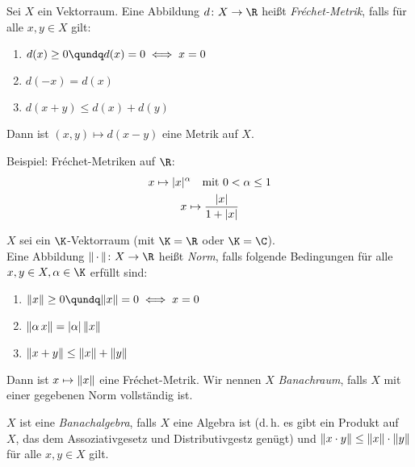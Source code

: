\begin{thEmpty}
    Sei $X$ ein Vektorraum. Eine Abbildung $d\colon X\to\R$ heißt
    \emph{Fr\'echet-Metrik}, falls für alle $x,y\in X$ gilt:
    \begin{enumerate}[({F}1),labelsep=1em,leftmargin=2cm]
        \item
            $d(x) \geq 0 \qundq d(x)=0 \iff x=0$
        \item
            $d(-x) = d(x)$
        \item
            $d(x+y) \leq d(x) + d(y)$
    \end{enumerate}
    Dann ist $(x,y)\mapsto d(x-y)$ eine Metrik auf $X$.

    Beispiel: Fr\'echet-Metriken auf $\R$:
    \begin{gather*}
        x\mapsto \lvert x\rvert^\alpha \quad\text{mit $0<\alpha\leq1$}
        \\
        x\mapsto \frac{\lvert x\rvert}{1+\lvert x\rvert}
    \end{gather*}
\end{thEmpty}


\begin{thEmpty}[Norm]
    $X$ sei ein $\K$-Vektorraum (mit $\K=\R$ oder $\K=\C$).\\
    Eine Abbildung $\emptyNorm\colon X\to\R$ heißt \emph{Norm}, falls folgende
    Bedingungen für alle $x,y\in X,\alpha\in\K$ erfüllt sind:
    \begin{enumerate}[({N}1),labelsep=1em,leftmargin=2cm]
        \item 
            $\norm{x}\geq 0 \qundq \norm{x}=0 \iff x=0$
        \item
            $\lVert\alpha\,x\rVert = \lvert\alpha\rvert \, \lVert x\rVert$
        \item
            $\lVert x+y\rVert \leq \lVert x\rVert + \lVert y\rVert$
    \end{enumerate}
    Dann ist $x\mapsto\lVert x\rVert$ eine Fr\'echet-Metrik. Wir nennen $X$
    \emph{Banachraum}, falls $X$ mit einer gegebenen Norm vollständig ist.

    $X$ ist eine \emph{Banachalgebra}, falls $X$ eine Algebra ist (d.\,h. es gibt 
    ein Produkt auf~$X$, das dem Assoziativgesetz und Distributivgestz genügt) und 
    $\lVert x\cdot y\rVert \leq \lVert x\rVert \cdot \lVert y\rVert$ für alle $x,y\in X$ gilt.
\end{thEmpty}

